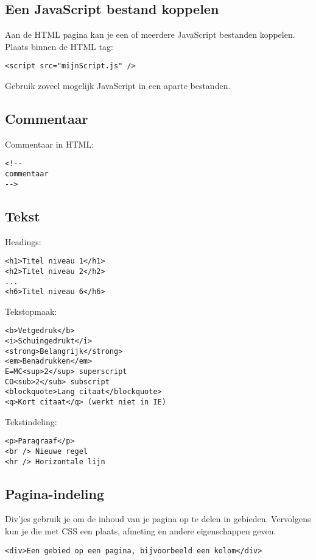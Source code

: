 \documentclass[8pt,pagesize,footinclude=false,headinclude=false]{scrartcl}
\begin{document}
\begin{multicols*}{4}
\subsection*{Een JavaScript bestand koppelen}
Aan de HTML pagina kan je een of meerdere JavaScript bestanden koppelen.\\
\noindent Plaats binnen de HTML tag:
\begin{lstlisting}[language=HTML5]
	<script src="mijnScript.js" />
\end{lstlisting}
\noindent Gebruik zoveel mogelijk JavaScript in een aparte bestanden.

\subsection*{Commentaar}
Commentaar in HTML:
\begin{lstlisting}[language=HTML5]
<!--
commentaar
-->
\end{lstlisting}

\subsection*{Tekst}
Headings:
\begin{lstlisting}[language=HTML5]
<h1>Titel niveau 1</h1>
<h2>Titel niveau 2</h2>
...
<h6>Titel niveau 6</h6>
\end{lstlisting}

\noindent Tekstopmaak:
\begin{lstlisting}[language=HTML5]
<b>Vetgedruk</b>
<i>Schuingedrukt</i>
<strong>Belangrijk</strong>
<em>Benadrukken</em>
E=MC<sup>2</sup> superscript
CO<sub>2</sub> subscript
<blockquote>Lang citaat</blockquote>
<q>Kort citaat</q> (werkt niet in IE)
\end{lstlisting}

\noindent Tekstindeling:
\begin{lstlisting}[language=HTML5]
<p>Paragraaf</p>
<br /> Nieuwe regel
<hr /> Horizontale lijn
\end{lstlisting}

\subsection*{Pagina-indeling}
Div'jes gebruik je om de inhoud van je pagina op te delen in gebieden. Vervolgens kun je die met CSS een plaats, afmeting en andere eigenschappen geven. 
\begin{lstlisting}[language=HTML5]
<div>Een gebied op een pagina, bijvoorbeeld een kolom</div>
\end{lstlisting}


\end{multicols*}
\end{document}
